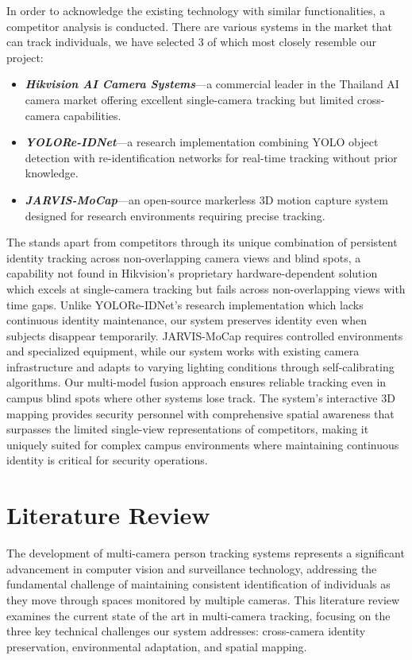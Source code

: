 In order to acknowledge the existing technology with similar functionalities, a competitor analysis is conducted.
There are various systems in the market that can track individuals, we have selected 3 of which most closely resemble our project:

\begin{itemize}
   \item \textbf{\textit{Hikvision AI Camera Systems}}---a commercial leader in the Thailand AI camera market offering excellent single-camera tracking but limited cross-camera capabilities.
   \item \textbf{\textit{YOLORe-IDNet}}---a research implementation combining YOLO object detection with re-identification networks for real-time tracking without prior knowledge.
   \item \textbf{\textit{JARVIS-MoCap}}---an open-source markerless 3D motion capture system designed for research environments requiring precise tracking.
\end{itemize}
\par
The \usevar{\srsTitle} stands apart from competitors through its unique combination of persistent identity tracking across non-overlapping camera views and blind spots, a capability not found in Hikvision's proprietary hardware-dependent solution which excels at single-camera tracking but fails across non-overlapping views with time gaps. Unlike YOLORe-IDNet's research implementation which lacks continuous identity maintenance, our system preserves identity even when subjects disappear temporarily. JARVIS-MoCap requires controlled environments and specialized equipment, while our system works with existing camera infrastructure and adapts to varying lighting conditions through self-calibrating algorithms. Our multi-model fusion approach ensures reliable tracking even in campus blind spots where other systems lose track. The system's interactive 3D mapping provides security personnel with comprehensive spatial awareness that surpasses the limited single-view representations of competitors, making it uniquely suited for complex campus environments where maintaining continuous identity is critical for security operations.

\section{Literature Review}
\label{section:literature-review}

The development of multi-camera person tracking systems represents a significant advancement in computer vision and surveillance technology, addressing the fundamental challenge of maintaining consistent identification of individuals as they move through spaces monitored by multiple cameras. This literature review examines the current state of the art in multi-camera tracking, focusing on the three key technical challenges our system addresses: cross-camera identity preservation, environmental adaptation, and spatial mapping.


